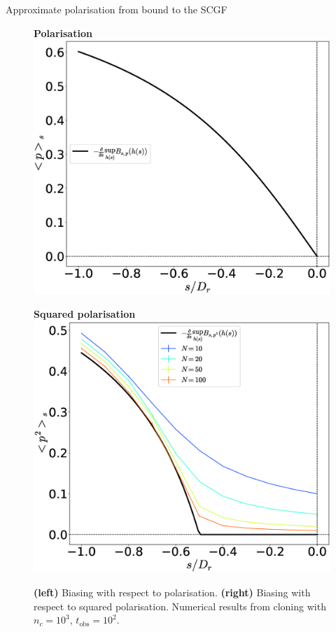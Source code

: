 \documentclass{beamer}
\begin{document}
\begin{frame}{Approximate polarisation from bound to the SCGF}

\vspace{-10pt}
\begin{figure}
\begin{minipage}{0.49\linewidth}
\centering
\bf Polarisation
\includegraphics[width=\textwidth]{approxOrder.eps}
\end{minipage}
\hfill
\begin{minipage}{0.49\linewidth}
\centering
\bf Squared polarisation
\includegraphics[width=\textwidth]{approxOrderSq_numerics.eps}
\end{minipage}
\caption{{\bf (left)} Biasing with respect to polarisation. {\bf (right)} Biasing with respect to squared polarisation. Numerical results from cloning with $n_c = 10^3$, $t_{\text{obs}} = 10^2$.}
\end{figure}


\end{frame}
\end{document}
